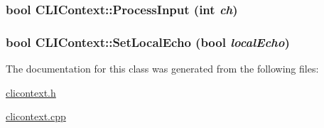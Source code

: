 \hypertarget{classCLIContext_4d8a44a878b5e5ebf767c55b7f872f63}{
\subsubsection[{ProcessInput}]{\setlength{\rightskip}{0pt plus 5cm}bool CLIContext::ProcessInput (int {\em ch})}}
\label{classCLIContext_4d8a44a878b5e5ebf767c55b7f872f63}


\hypertarget{classCLIContext_f38452b224b03da39d12158922a90d19}{
\subsubsection[{SetLocalEcho}]{\setlength{\rightskip}{0pt plus 5cm}bool CLIContext::SetLocalEcho (bool {\em localEcho})}}
\label{classCLIContext_f38452b224b03da39d12158922a90d19}




The documentation for this class was generated from the following files:\begin{CompactItemize}
\item 
\hyperlink{clicontext_8h}{clicontext.h}\item 
\hyperlink{clicontext_8cpp}{clicontext.cpp}\end{CompactItemize}
